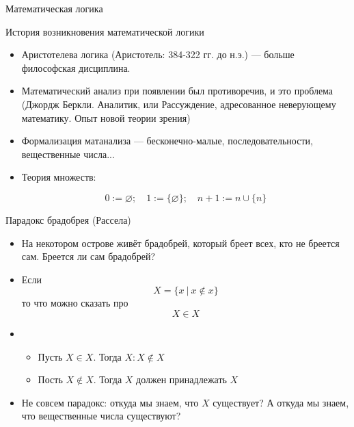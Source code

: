 \documentclass[aspectratio=169]{beamer}
\begin{document}
\newtheorem{axiom}{Аксиома}
\newtheorem{exmprus}{Пример}
\newtheorem{defrus}{Определение}
\newtheorem{lemmarus}{Лемма}
\newtheorem{thmrus}{Лемма}

\begin{frame}{}
\begin{center}\Large Математическая логика\end{center}
\end{frame}

\begin{frame}{История возникновения математической логики}
\begin{itemize}
\item Аристотелева логика (Аристотель: 384-322 гг. до н.э.) --- больше философская дисциплина.\pause
\item Математический анализ при появлении был противоречив, и это проблема
(Джордж Беркли. Аналитик, или Рассуждение, адресованное неверующему математику. Опыт новой теории зрения)\pause
\item Формализация матанализа --- бесконечно-малые, последовательности, вещественные числа...\pause
\item Теория множеств:

$$0 := \varnothing; \quad 1 := \{ \varnothing \}; \quad n+1 := n \cup \{ n \} $$
\end{itemize}
\end{frame}

\begin{frame}{Парадокс брадобрея (Рассела)}

\begin{itemize}
\item На некотором острове живёт брадобрей, который бреет всех, кто не бреется
сам. Бреется ли сам брадобрей? \pause
\item Если
$$X = \{ x \ |\ x \notin x\}$$ \pause
то что можно сказать про
$$X \in X$$ \pause

\item \begin{itemize}
\item Пусть $X \in X$. Тогда $X : X \notin X$\pause
\item Пость $X \notin X$. Тогда $X$ должен принадлежать $X$\pause
\end{itemize}

\item Не совсем парадокс: откуда мы знаем, что $X$ существует? \pause
А откуда мы знаем, что вещественные числа существуют?
\end{itemize}
\end{frame}
\end{document}
